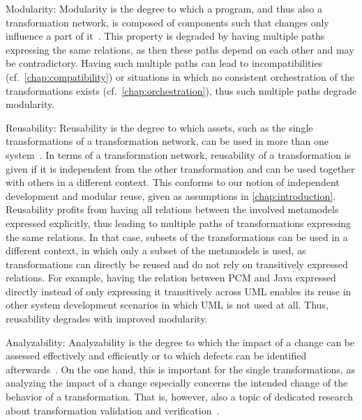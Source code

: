 \begin{properdescription}
    \item[Modularity:] 
    Modularity is the degree to which a program, and thus also a transformation network, is composed of components such that changes only influence a part of it~\cite{iso25010}.
    This property is degraded by having multiple paths expressing the same relations, as then these paths depend on each other and may be contradictory. 
    Having such multiple paths can lead to incompatibilities (cf.\ \autoref{chap:compatibility}) or situations in which no consistent orchestration of the transformations exists (cf.\ \autoref{chap:orchestration}), thus such multiple paths degrade modularity.
    \item[Reusability:]
    Reusability is the degree to which assets, such as the single transformations of a transformation network, can be used in more than one system~\cite{iso25010}.
    In terms of a transformation network, reusability of a transformation is given if it is independent from the other transformation and can be used together with others in a different context.
    This conforms to our notion of independent development and modular reuse, given as assumptions in \autoref{chap:introduction}.
    Reusability profits from having all relations between the involved metamodels expressed explicitly, thus leading to multiple paths of transformations expressing the same relations.
    In that case, subsets of the transformations can be used in a different context, in which only a subset of the metamodels is used, as transformations can directly be reused and do not rely on transitively expressed relations.
    For example, having the relation between \gls{PCM} and Java expressed directly instead of only expressing it transitively across \gls{UML} enables its reuse in other system development scenarios in which \gls{UML} is not used at all.
    Thus, reusability degrades with improved modularity.    
    \item[Analyzability:] 
    Analyzability is the degree to which the impact of a change can be assessed effectively and efficiently or to which defects can be identified afterwards~\cite{iso25010}.
    On the one hand, this is important for the single transformations, as analyzing the impact of a change especially concerns the intended change of the behavior of a transformation. That is, however, also a topic of dedicated research about transformation validation and verification~\cite{cabot2010VerificationInvariants-JSS, rahim2015SurveyTransformationVerification-SoSym, azizi2017ContractVerification-ICCKE, vallecillo2012FormalTesting-FMMDE}.

\end{properdescription}
